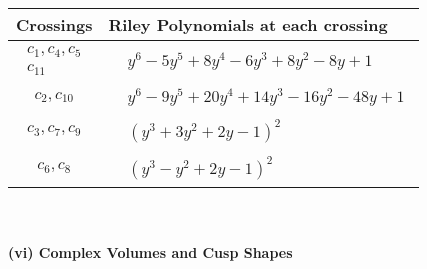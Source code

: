 \documentclass[1p]{elsarticle_modified}
\theoremstyle{definition}
\begin{document}
\begin{tabular}{m{50pt}|m{274pt}}
Crossings & \hspace{64pt}Riley Polynomials at each crossing \\
\hline $$\begin{aligned}c_{1},c_{4},c_{5}\\c_{11}\end{aligned}$$&$\begin{aligned}
&y^6-5 y^5+8 y^4-6 y^3+8 y^2-8 y+1
\end{aligned}$\\
\hline $$\begin{aligned}c_{2},c_{10}\end{aligned}$$&$\begin{aligned}
&y^6-9 y^5+20 y^4+14 y^3-16 y^2-48 y+1
\end{aligned}$\\
\hline $$\begin{aligned}c_{3},c_{7},c_{9}\end{aligned}$$&$\begin{aligned}
&(y^3+3 y^2+2 y-1)^2
\end{aligned}$\\
\hline $$\begin{aligned}c_{6},c_{8}\end{aligned}$$&$\begin{aligned}
&(y^3- y^2+2 y-1)^2
\end{aligned}$\\
\hline
\end{tabular}\\~\\
\newpage\flushleft \textbf{(vi) Complex Volumes and Cusp Shapes}
\end{document}
